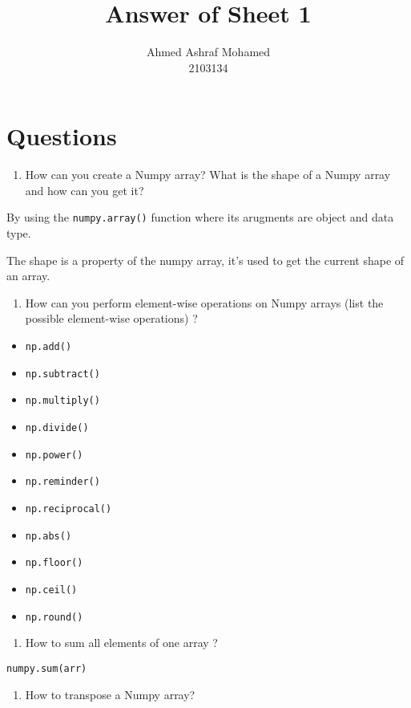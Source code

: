 \documentclass[12pt]{article}
\title{Answer of Sheet 1}
\author{Ahmed Ashraf Mohamed \\ 2103134}
\date{}
\begin{document}
\maketitle
\section*{Questions}
\begin{enumerate}
    \item How can you create a Numpy array? What is the shape of a Numpy array and how can you get it?
\end{enumerate}
By using the \texttt{numpy.array()} function where its arugments are object and data type.

The shape is a property of the numpy array, it's used to get the current shape of an array.

\begin{enumerate}[resume]
    \item How can you perform element-wise operations on Numpy arrays (list the possible element-wise operations) ?
\end{enumerate}

\begin{itemize}
    \item \texttt{np.add()}
    \item \texttt{np.subtract()}
    \item \texttt{np.multiply()}
    \item \texttt{np.divide()}
    \item \texttt{np.power()}
    \item \texttt{np.reminder()}
    \item \texttt{np.reciprocal()}
    \item \texttt{np.abs()}
    \item \texttt{np.floor()}
    \item \texttt{np.ceil()}
    \item \texttt{np.round()}
\end{itemize}

\begin{enumerate}[resume]
    \item How to sum all elements of one array ?
\end{enumerate}

\texttt{numpy.sum(arr)}

\begin{enumerate}[resume]
    \item How to transpose a Numpy array?
\end{enumerate}
\end{document}
